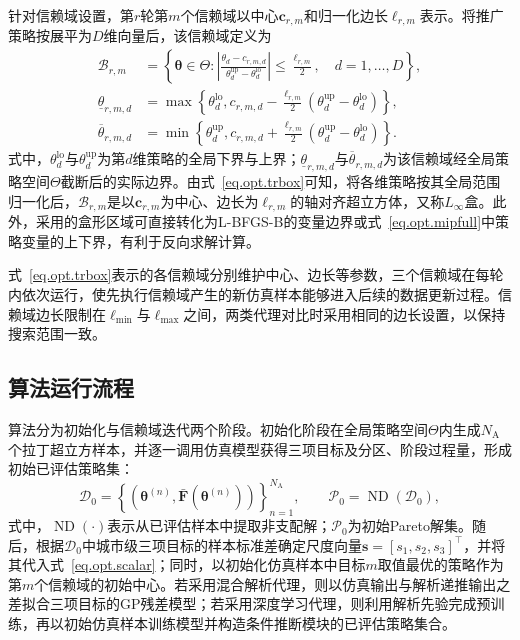 针对信赖域设置，第$r$轮第$m$个信赖域以中心$\bm c_{r,m}$和归一化边长$\ell_{r,m}$表示。将推广策略按展平为$D$维向量后，该信赖域定义为
\begin{equation}
\begin{aligned}
\mathcal B_{r,m}
&=
\left\{
\bm{\theta}\in\Theta:
\left|
\frac{\theta_d-c_{r,m,d}}
{\theta_d^{\mathrm{up}}-\theta_d^{\mathrm{lo}}}
\right|
\leq\frac{\ell_{r,m}}{2},
\quad d=1,\ldots,D
\right\},\\
\underline{\theta}_{r,m,d}
&=
\max\left\{
\theta_d^{\mathrm{lo}},
c_{r,m,d}
-\frac{\ell_{r,m}}{2}
\left(\theta_d^{\mathrm{up}}-\theta_d^{\mathrm{lo}}\right)
\right\},\\
\overline{\theta}_{r,m,d}
&=
\min\left\{
\theta_d^{\mathrm{up}},
c_{r,m,d}
+\frac{\ell_{r,m}}{2}
\left(\theta_d^{\mathrm{up}}-\theta_d^{\mathrm{lo}}\right)
\right\}.
\end{aligned}
\label{eq.opt.trbox}
\end{equation}
式中，$\theta_d^{\mathrm{lo}}$与$\theta_d^{\mathrm{up}}$为第$d$维策略的全局下界与上界；$\underline{\theta}_{r,m,d}$与$\overline{\theta}_{r,m,d}$为该信赖域经全局策略空间$\Theta$截断后的实际边界。由式~\eqref{eq.opt.trbox}可知，将各维策略按其全局范围归一化后，$\mathcal B_{r,m}$是以$\bm c_{r,m}$为中心、边长为$\ell_{r,m}$的轴对齐超立方体，又称$L_{\infty}$盒。此外，采用的盒形区域可直接转化为L-BFGS-B的变量边界或式~\eqref{eq.opt.mipfull}中策略变量的上下界，有利于反向求解计算。

式~\eqref{eq.opt.trbox}表示的各信赖域分别维护中心、边长等参数，三个信赖域在每轮内依次运行，使先执行信赖域产生的新仿真样本能够进入后续的数据更新过程。信赖域边长限制在$\ell_{\min}$与$\ell_{\max}$之间，两类代理对比时采用相同的边长设置，以保持搜索范围一致。

\subsection{算法运行流程}\label{subsec.opt.mobo.flow}\label{subsec.opt.mobo.acq}

算法分为初始化与信赖域迭代两个阶段。初始化阶段在全局策略空间$\Theta$内生成$N_{\mathrm{A}}$个拉丁超立方样本，并逐一调用仿真模型获得三项目标及分区、阶段过程量，形成初始已评估策略集：
\begin{equation}
\mathcal D_{0}
=
\left\{
\left(
\bm{\theta}^{(n)},
\bar{\bm F}\left(\bm{\theta}^{(n)}\right)
\right)
\right\}_{n=1}^{N_{\mathrm{A}}},
\qquad
\mathcal P_{0}
=
\operatorname{ND}\left(\mathcal D_{0}\right),
\label{eq.opt.phaseainit}
\end{equation}
式中，$\operatorname{ND}(\cdot)$表示从已评估样本中提取非支配解；$\mathcal P_0$为初始Pareto解集。随后，根据$\mathcal D_0$中城市级三项目标的样本标准差确定尺度向量$\bm s=[s_1,s_2,s_3]^{\top}$，并将其代入式~\eqref{eq.opt.scalar}；同时，以初始化仿真样本中目标$m$取值最优的策略作为第$m$个信赖域的初始中心。若采用混合解析代理，则以仿真输出与解析递推输出之差拟合三项目标的GP残差模型；若采用深度学习代理，则利用解析先验完成预训练，再以初始仿真样本训练模型并构造条件推断模块的已评估策略集合。

